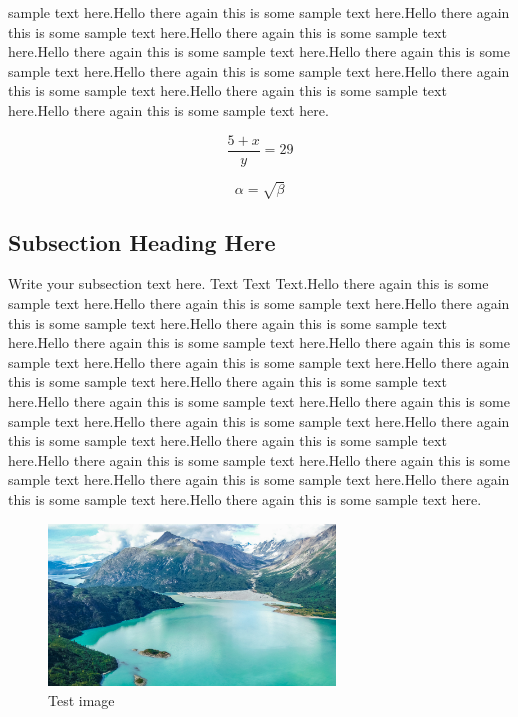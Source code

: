 \documentclass{article}
\begin{document}
sample text here.Hello there again this is some sample text here.Hello there again this is some sample text here.Hello there again this is some sample text here.Hello there again this is some sample text here.Hello there again this is some sample text here.Hello there again this is some sample text here.Hello there again this is some sample text here.Hello there again this is some sample text here.Hello there again this is some sample text here.

\begin{equation}
	\frac{5 + x}{y} = 29
\end{equation}

\begin{equation}
    \label{simple_equation}
    \alpha = \sqrt{ \beta }
\end{equation}

\subsection{Subsection Heading Here}
Write your subsection text here. Text Text Text.Hello there again this is some sample text here.Hello there again this is some sample text here.Hello there again this is some sample text here.Hello there again this is some sample text here.Hello there again this is some sample text here.Hello there again this is some sample text here.Hello there again this is some sample text here.Hello there again this is some sample text here.Hello there again this is some sample text here.Hello there again this is some sample text here.Hello there again this is some sample text here.Hello there again this is some sample text here.Hello there again this is some sample text here.Hello there again this is some sample text here.Hello there again this is some sample text here.Hello there again this is some sample text here.Hello there again this is some sample text here.Hello there again this is some sample text here.Hello there again this is some sample text here.

\begin{figure}
    \centering
    \includegraphics[width=3.0in]{myfigure.jpg}
    \caption{Test image}
    \label{simulationfigure}
\end{figure}
\end{document}
